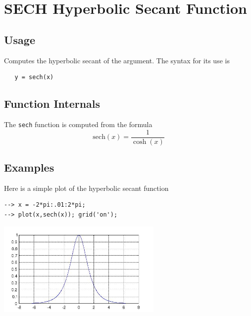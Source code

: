 \section{SECH Hyperbolic Secant Function}

\subsection{Usage}

Computes the hyperbolic secant of the argument.
The syntax for its use is
\begin{verbatim}
   y = sech(x)
\end{verbatim}
\subsection{Function Internals}

The \verb|sech| function is computed from the formula
\[
   \mathrm{sech}(x) = \frac{1}{\cosh(x)}
\]
\subsection{Examples}

Here is a simple plot of the hyperbolic secant function
\begin{verbatim}
--> x = -2*pi:.01:2*pi;
--> plot(x,sech(x)); grid('on');
\end{verbatim}


\centerline{\includegraphics[width=8cm]{sechplot}}

